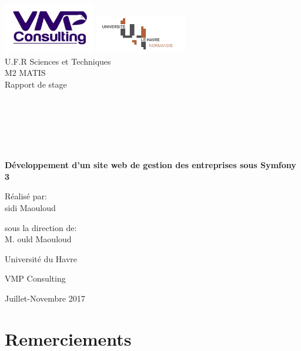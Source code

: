 \documentclass[12pt]{article}
\begin{document}
\begin{titlepage}
\begin{center}

\hfill
\vfill
\bigskip
\huge{ \includegraphics[width=0.3\textwidth]{logo.png} 
\includegraphics[width=0.3\textwidth]{lh.png} \\
U.F.R Sciences et Techniques \\
M2 MATIS  \\
 Rapport de stage \\  \\ \\ \\ \\
 } 
\vfill
\bigskip 
\Huge 
\bigskip %
\\ \\
\textbf{ Développement d'un site web de gestion des entreprises sous Symfony 3 } \par 
\vfill

\Large \begin{flushleft}
 Réalisé par:\\ sidi Maouloud \par
\end{flushleft}
		 
		  \begin{flushright}
		                    sous la direction de:\\  M. ould Maouloud
		                   \end{flushright}



		 
\vfill
\Large Université du Havre \par \Large VMP Consulting		
		\bigskip 
\bigskip

\Large
Juillet-Novembre 2017
\end{center}
\end{titlepage}

\section*{Remerciements}
\end{document}
